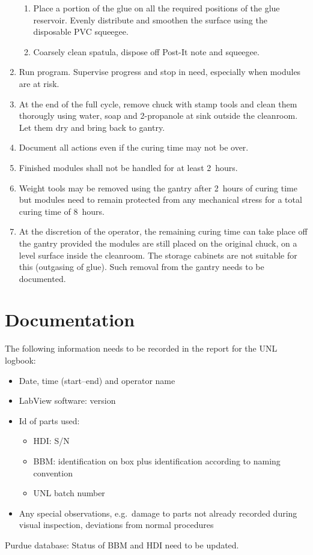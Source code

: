 \documentclass[12pt]{unlsilabsop}
\begin{document}
\begin{enumerate}
\begin{enumerate}
	\item Place a portion of the glue on all the required positions of the glue reservoir. Evenly distribute and smoothen the surface using the disposable PVC squeegee.
	\item Coarsely clean spatula, dispose off Post-It note and squeegee.
    \end{enumerate}
    \item Run program. Supervise progress and stop in need, especially when modules are at risk.
    \item At the end of the full cycle, remove chuck with stamp tools and clean them thorougly using water, soap and 2-propanole at sink outside the cleanroom. Let them dry and bring back to gantry.
    \item Document all actions even if the curing time may not be over.
    \item Finished modules shall not be handled for at least 2~hours.
    \item Weight tools may be removed using the gantry after 2~hours of curing time but modules need to remain protected from any mechanical stress for a total curing time of 8~hours.
    \item At the discretion of the operator, the remaining curing time can take place off the gantry provided the modules are still placed on the original chuck, on a level surface inside the cleanroom. The storage cabinets are not suitable for this (outgasing of glue). Such removal from the gantry needs to be documented.
\end{enumerate}

\section{Documentation}
The following information needs to be recorded in the report for the UNL logbook:
\begin{itemize}
    \item Date, time (start--end) and operator name
    \item LabView software: version
    \item Id of parts used:
	\begin{itemize}
	    \item HDI: S/N
	    \item BBM: identification on box plus identification according to naming convention
	    \item UNL batch number
	\end{itemize}
    \item Any special observations, e.g.~damage to parts not already recorded during visual inspection, deviations from normal procedures
\end{itemize}

Purdue database: Status of BBM and HDI need to be updated.
\end{document}

